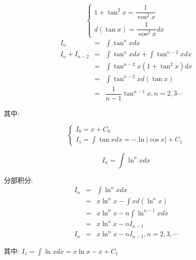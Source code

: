 \begin{theorem}[递归积分]
\begin{solution}
		$$\begin{cases}
			1+\tan^{2} x = \dfrac{1}{\cos^{2} x}\\
			d(\tan x) = \dfrac{1}{\cos^{2} x}dx
		\end{cases}$$
		\begin{eqnarray*}
			I_{n} 		   & = & \int \tan^{n} xdx\\
			I_{n} +I_{n-2} & = & \int \tan^{n} xdx + \int \tan^{n-2}xdx\\
				           & = & \int \tan^{n-2} x(1+\tan^{2}x)dx\\
				           & = & \int \tan^{n-2} x d(\tan x)\\
				           & = & \dfrac{1}{n-1}\tan^{n-1} x, n = 2,3\cdots
		\end{eqnarray*}
		
		其中:

		$$\begin{cases} 
			I_{0} = x + C_{0}  \\ 
			I_{1} = \int \tan xdx = -\ln|\cos x|+C_{1} 
		\end{cases}$$
	\end{solution}
	\begin{proposition}
		$$I_{n} = \int \ln^{n} xdx$$ 
	\end{proposition}
	\begin{solution}

		分部积分:
		\begin{eqnarray*}
			I_{n} & = & \int \ln^{n} xdx\\
			      & = & x\ln^{n}x - \int xd(\ln^{n}x)\\
				  & = & x\ln^{n}x - n\int \ln^{n-1} x dx\\
			      & = & x\ln^{n} x -n I_{n-1}\\
			I_{n} & = & x\ln^{n} x -n I_{n-1}, n = 2,3,\cdots 
		\end{eqnarray*}

		其中: $I_{1} = \int \ln xdx = x\ln x -x +C_{1}$
	\end{solution}
\end{theorem}
